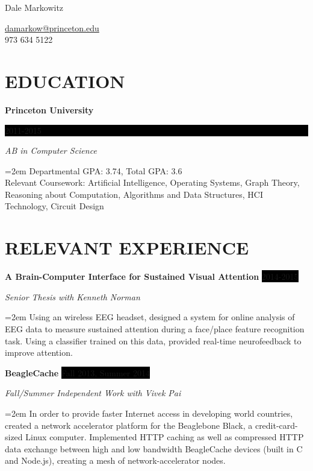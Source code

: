 \documentclass[paper=a4,fontsize=11pt]{scrartcl} %
\newcommand{\sepspace}{\vspace*{1em}}		%
\newcommand{\MyName}[1]{ %
		\Huge \usefont{OT1}{phv}{b}{n} \hfill #1
		\par \normalsize \normalfont}
\newcommand{\NewPart}[1]{\section*{\uppercase{#1}}}
\newcommand{\EducationEntry}[4]{
		\noindent \textbf{#1} \hfill      %
		\colorbox{Black}{%
			\parbox{6em}{%
			\hfill\color{White}#2}} \par  %
		\noindent \textit{#3} \par        %
		\noindent\hangindent=2em\hangafter=0 \small #4 %
		\normalsize \par}
\newcommand{\WorkEntry}[4]{				  %
		\noindent \textbf{#1} \hfill      %
		\colorbox{Black}{\color{White}#2} \par  %
		\noindent \textit{#3} \par              %
		\noindent\hangindent=2em\hangafter=0 \small #4 %
		\normalsize \par}
\begin{document}
\MyName{\begin{center} Dale Markowitz \end{center}} 
\begin{center} \url{damarkow@princeton.edu}\\\vspace{5pt}973 634 5122 \end{center}

\sepspace



\NewPart{Education}{}

\EducationEntry{Princeton University}{2011-2015}{AB in Computer Science}{
	Departmental GPA: 3.74, Total GPA: 3.6\\
	Relevant Coursework: Artificial Intelligence, Operating Systems, Graph Theory, Reasoning about Computation, Algorithms and Data Structures, HCI Technology, Circuit Design
}
\sepspace
%


\NewPart{Relevant Experience}{}


\WorkEntry{A Brain-Computer Interface for Sustained Visual Attention}{2014-2015}{Senior Thesis with Kenneth Norman}{
	 Using an wireless EEG headset, designed a system for online analysis of EEG data to measure sustained attention
during a face/place feature recognition task. Using a classifier trained on this data, provided real-time 
neurofeedback to improve attention.  
}
\sepspace

\WorkEntry{BeagleCache}{Fall 2013, Summer 2014}{Fall/Summer Independent Work with Vivek Pai}{
	In order to provide faster Internet access in developing world countries, created a network accelerator platform for the Beaglebone Black, a credit-card-sized Linux computer.  Implemented HTTP caching as well as compressed HTTP data exchange between high and low bandwidth BeagleCache devices (built in C and Node.js), creating a mesh of network-accelerator nodes.
}
\sepspace
\end{document}
